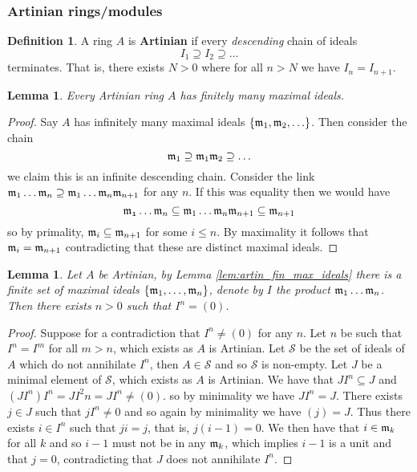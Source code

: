 \documentclass[12pt]{article}
\theoremstyle{plain}
\newtheorem{lemma}[thm]{Lemma}
\theoremstyle{definition}
\newtheorem{defn}[thm]{Definition} %
\newcommand{\call}[1]{\mathcal{#1}}
\begin{document}
\subsubsection{Artinian rings/modules}
\begin{defn}
A ring $A$ is \textbf{Artinian} if every \emph{descending} chain of ideals
\[I_1 \supseteq I_2 \supseteq \hdots\]
terminates. That is, there exists $N > 0$ where for all $n > N$ we have $I_n = I_{n+1}$.
\end{defn}
\begin{lemma}
Every Artinian ring $A$ has finitely many maximal ideals.
\end{lemma}
\begin{proof}
\label{lem:artin_fin_max_ideals}
Say $A$ has infinitely many maximal ideals $\lbrace \frak{m}_1,\frak{m}_2,\hdots\rbrace$. Then consider the chain
\[\frak{m}_1 \supseteq \frak{m}_1\frak{m}_2 \supseteq \hdots\]
we claim this is an infinite descending chain. Consider the link $\frak{m}_1\hdots \frak{m}_n \supseteq \frak{m}_1\hdots \frak{m}_n\frak{m}_{n+1}$ for any $n$. If this was equality then we would have
\[\frak{m_1}\hdots \frak{m}_n \subseteq \frak{m}_1\hdots\frak{m}_n\frak{m}_{n+1} \subseteq \frak{m}_{n+1}\]
so by primality, $\frak{m}_i \subseteq \frak{m}_{n+1}$ for some $i \leq n$. By maximality it follows that $\frak{m}_i = \frak{m}_{n+1}$ contradicting that these are distinct maximal ideals.
\end{proof}
\begin{lemma}
Let $A$ be Artinian, by Lemma \ref{lem:artin_fin_max_ideals} there is a finite set of maximal ideals $\lbrace \frak{m}_1,\hdots,\frak{m}_n\rbrace$, denote by $I$ the product $\frak{m}_1\hdots\frak{m}_n$. Then there exists $n > 0$ such that $I^n = (0)$.
\end{lemma}
\begin{proof}
Suppose for a contradiction that $I^n \neq (0)$ for any $n$. Let $n$ be such that $I^n = I^{m}$ for all $m > n$, which exists as $A$ is Artinian. Let $\call{S}$ be the set of ideals of $A$ which do not annihilate $I^n$, then $A \in \call{S}$ and so $\call{S}$ is non-empty. Let $J$ be a minimal element of $\call{S}$, which exists as $A$ is Artinian. We have that $JI^n \subseteq J$ and $(JI^n)I^n = JI^2n = JI^n \neq (0)$. so by minimality we have $JI^n = J$. There exists $j \in J$ such that $jI^n \neq 0$ and so again by minimality we have $(j) = J$. Thus there exists $i \in I^n$ such that $ji = j$, that is, $j(i - 1) = 0$. We then have that $i \in \frak{m}_k$ for all $k$ and so $i - 1$ must not be in any $\frak{m}_k$, which implies $i - 1$ is a unit and that $j = 0$, contradicting that $J$ does not annihilate $I^n$.
\end{proof}
\end{document}
